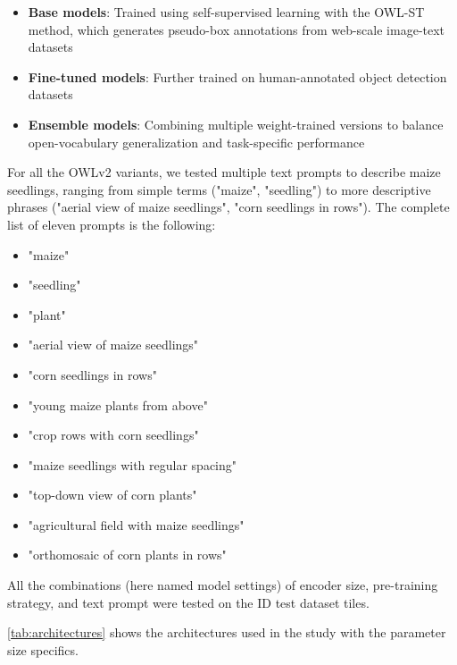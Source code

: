 \documentclass[12pt,a4paper,oneside]{report}
\begin{document}
\begin{itemize}
    \item \textbf{Base models}: Trained using self-supervised learning with the OWL-ST method, which generates pseudo-box annotations from web-scale image-text datasets
    \item \textbf{Fine-tuned models}: Further trained on human-annotated object detection datasets
    \item \textbf{Ensemble models}: Combining multiple weight-trained versions to balance open-vocabulary generalization and task-specific performance
\end{itemize}

For all the OWLv2 variants, we tested multiple text prompts to describe maize seedlings, 
ranging from simple terms ("maize", "seedling") to more descriptive phrases 
("aerial view of maize seedlings", "corn seedlings in rows"). The complete list of 
eleven prompts is the following: 
\begin{itemize}
    \item "maize"
    \item "seedling"
    \item "plant"
    \item "aerial view of maize seedlings"
    \item "corn seedlings in rows"
    \item "young maize plants from above"
    \item "crop rows with corn seedlings"
    \item "maize seedlings with regular spacing"
    \item "top-down view of corn plants"
    \item "agricultural field with maize seedlings"
    \item "orthomosaic of corn plants in rows"
\end{itemize}
All the combinations (here named model 
settings) of encoder size, pre-training strategy, and text prompt were tested on the 
ID test dataset tiles.

\cref{tab:architectures} shows the architectures used in the study 
with the parameter size specifics.
\end{document}
